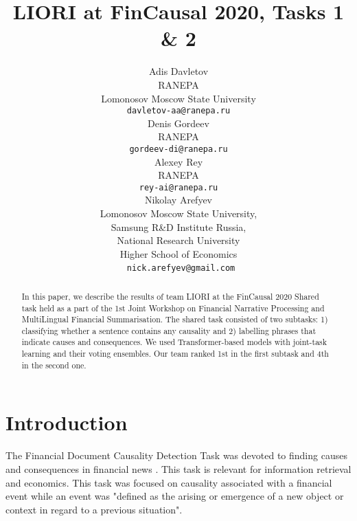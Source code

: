\documentclass[11pt]{article}
\title{LIORI at FinCausal 2020, Tasks 1 \& 2}
\author{Adis Davletov \\
	RANEPA \\
	Lomonosov Moscow State University \\
	{\tt davletov-aa@ranepa.ru} \\\And
	Denis Gordeev \\
	RANEPA \\
	{\tt gordeev-di@ranepa.ru} \\\AND
	Alexey Rey \\
	RANEPA \\
	{\tt {rey-ai}@ranepa.ru}\\\And
	Nikolay Arefyev \\
	Lomonosov Moscow State University,\\
	Samsung R\&D Institute Russia,\\
	National Research University \\ Higher School of Economics \\ \
	\tt{nick.arefyev@gmail.com} \\
}
\date{}
\begin{document}
\maketitle

\begin{abstract}
In this paper, we describe the results of team LIORI at the FinCausal 2020 Shared task held as a part of the 1st Joint Workshop on Financial Narrative Processing and MultiLingual Financial Summarisation. The shared task consisted of two subtasks: 1) classifying whether a sentence contains any causality and 2) labelling phrases that indicate causes and consequences. We used Transformer-based models with joint-task learning and their voting ensembles. Our team ranked 1st in the first subtask and 4th in the second one.
\end{abstract}

%
% 

\section{Introduction}
\label{intro}

The Financial Document Causality Detection Task was devoted to finding causes and consequences in financial news \cite{Mariko-fincausal-2020}. This task is relevant for information retrieval and economics. This task was focused on causality associated with a financial event while an event was "defined as the arising or emergence of a new object or context in regard to a previous situation".
\end{document}
